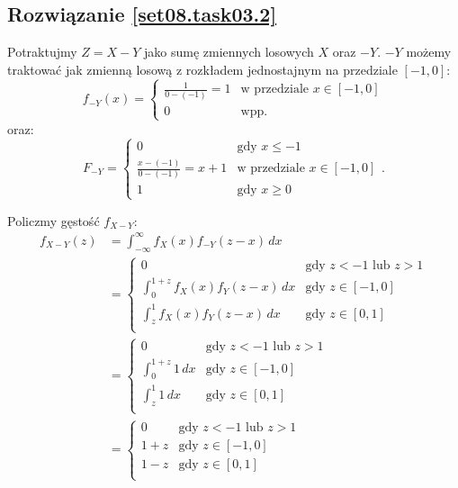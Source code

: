 \subsection*{Rozwiązanie \ref{set08.task03.2}}
Potraktujmy \(Z = X - Y\) jako sumę zmiennych losowych \(X\) oraz \(-Y\).
\(-Y\) możemy traktować jak zmienną losową z rozkładem jednostajnym na przedziale
\([-1, 0]\):
\[
	f_{-Y}(x)
	= \begin{cases}
		\frac{1}{0-(-1)} = 1 & \text{w przedziale } x \in [-1, 0] \\
		0                    & \text{wpp.}
	\end{cases}
\]
oraz:
\[
	F_{-Y}
	= \begin{cases}
		0                           & \text{gdy } x \leq -1              \\
		\frac{x-(-1)}{0-(-1)} = x+1 & \text{w przedziale } x \in [-1, 0] \\
		1                           & \text{gdy } x \geq 0
	\end{cases}.
\]

Policzmy gęstość \(f_{X-Y}\):
\begin{align*}
	f_{X-Y}(z)
	 & = \int_{-\infty}^{\infty} f_X(x) f_{-Y}(z-x) \, dx          \\
	 & = \begin{cases}
		     0
		      & \text{gdy \(z < -1\) lub \(z > 1\)} \\
		     \int_{0}^{1+z} f_X(x) f_Y(z-x) \, dx
		      & \text{gdy \(z \in [-1, 0]\)}        \\
		     \int_{z}^{1} f_X(x) f_Y(z-x) \, dx
		      & \text{gdy \(z \in [0, 1]\)}         \\
	     \end{cases}
	\tag{2}\label{set08.task03.2.tagA}                             \\
	 & = \begin{cases}
		     0
		      & \text{gdy \(z < -1\) lub \(z > 1\)} \\
		     \int_{0}^{1+z} 1 \, dx
		      & \text{gdy \(z \in [-1, 0]\)}        \\
		     \int_{z}^{1} 1 \, dx
		      & \text{gdy \(z \in [0, 1]\)}         \\
	     \end{cases}        \\
	 & = \boxed{\begin{cases}
			            0
			             & \text{gdy \(z < -1\) lub \(z > 1\)} \\
			            1+z
			             & \text{gdy \(z \in [-1, 0]\)}        \\
			            1-z
			             & \text{gdy \(z \in [0, 1]\)}         \\
		            \end{cases}} \\
\end{align*}

